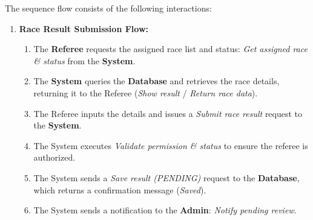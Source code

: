 The sequence flow consists of the following interactions:
\begin{enumerate}
	\item \textbf{Race Result Submission Flow:}
	\begin{enumerate}
		\item The \textbf{Referee} requests the assigned race list and status: \textit{Get assigned race \& status} from the \textbf{System}.
		\item The \textbf{System} queries the \textbf{Database} and retrieves the race details, returning it to the Referee (\textit{Show result} / \textit{Return race data}).
		\item The Referee inputs the details and issues a \textit{Submit race result} request to the \textbf{System}.
		\item The System executes \textit{Validate permission \& status} to ensure the referee is authorized.
		\item The System sends a \textit{Save result (PENDING)} request to the \textbf{Database}, which returns a confirmation message (\textit{Saved}).
		\item The System sends a notification to the \textbf{Admin}: \textit{Notify pending review}.
	\end{enumerate}
	

\end{enumerate}
